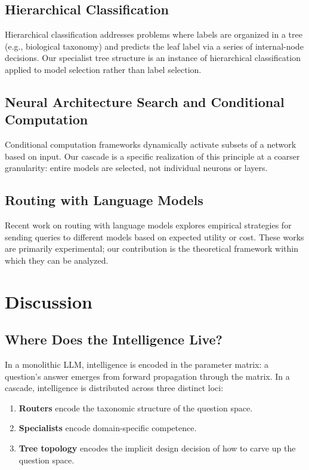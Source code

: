 \documentclass[11pt,a4paper]{article}
\theoremstyle{definition}
\theoremstyle{remark}
\begin{document}
\subsection{Hierarchical Classification}

Hierarchical classification \citep{silla2011survey} addresses problems where labels are organized in a tree (e.g., biological taxonomy) and predicts the leaf label via a series of internal-node decisions. Our specialist tree structure is an instance of hierarchical classification applied to model selection rather than label selection.

\subsection{Neural Architecture Search and Conditional Computation}

Conditional computation frameworks \citep{bengio2013estimating, bengio2015conditional} dynamically activate subsets of a network based on input. Our cascade is a specific realization of this principle at a coarser granularity: entire models are selected, not individual neurons or layers.

\subsection{Routing with Language Models}

Recent work on routing with language models \citep{ravaut2022hierarchical, chen2023frugalgpt, shnitzer2023large} explores empirical strategies for sending queries to different models based on expected utility or cost. These works are primarily experimental; our contribution is the theoretical framework within which they can be analyzed.

\section{Discussion}
\label{sec:discussion}

\subsection{Where Does the Intelligence Live?}

In a monolithic LLM, intelligence is encoded in the parameter matrix: a question's answer emerges from forward propagation through the matrix. In a cascade, intelligence is distributed across three distinct loci:
\begin{enumerate}
    \item \textbf{Routers} encode the taxonomic structure of the question space.
    \item \textbf{Specialists} encode domain-specific competence.
    \item \textbf{Tree topology} encodes the implicit design decision of how to carve up the question space.
\end{enumerate}
\end{document}
